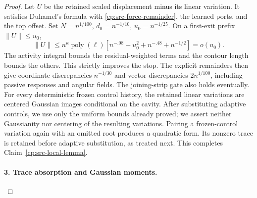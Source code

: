 \begin{proof}
Let \(U\) be the retained scaled displacement minus its linear
variation.  It satisfies Duhamel's formula with
\eqref{cp:src-force-remainder}, the learned ports, and the top offset.
Set \(N=n^{1/100}\), \(d_0=n^{-1/10}\), \(u_0=n^{-1/25}\).
On a first-exit prefix \(\|U\|\le u_0\),
\begin{equation}
 \|U\|\le n^\kappa\operatorname{poly}(\ell)
 [n^{-.08}+u_0^2+n^{-.48}+n^{-1/2}]=o(u_0).
 \label{cp:src-local-close}
\end{equation}
The activity integral bounds the residual-weighted terms and the
contour length bounds the others.  This strictly improves the stop.
The explicit remainders then give coordinate discrepancies
\(n^{-1/30}\) and vector discrepancies \(2n^{1/100}\), including
passive responses and angular fields.  The joining-strip gate also
holds eventually. For every deterministic frozen control history, the
retained linear variations are centered Gaussian images conditional on
the cavity. After substituting adaptive controls, we use only the
uniform bounds already proved; we assert neither Gaussianity nor
centering of the resulting variations. Pairing a frozen-control
variation again with an omitted root produces a quadratic form. Its
nonzero trace is retained before adaptive substitution, as treated next.
This completes Claim~\ref{cp:src-local-lemma}.

\paragraph{3. Trace absorption and Gaussian moments.}
\label{cp:src-moments}


\end{proof}
